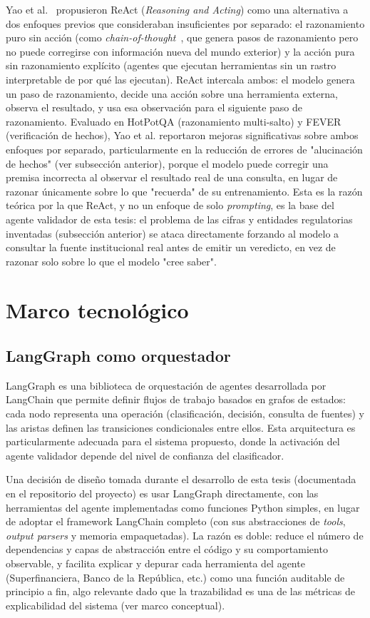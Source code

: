 Yao et al.~\cite{Yao2023} propusieron ReAct (\textit{Reasoning and Acting}) como una alternativa a dos enfoques previos que consideraban insuficientes por separado: el razonamiento puro sin acción (como \textit{chain-of-thought}~\cite{Wei2022}, que genera pasos de razonamiento pero no puede corregirse con información nueva del mundo exterior) y la acción pura sin razonamiento explícito (agentes que ejecutan herramientas sin un rastro interpretable de por qué las ejecutan). ReAct intercala ambos: el modelo genera un paso de razonamiento, decide una acción sobre una herramienta externa, observa el resultado, y usa esa observación para el siguiente paso de razonamiento. Evaluado en HotPotQA (razonamiento multi-salto) y FEVER (verificación de hechos), Yao et al. reportaron mejoras significativas sobre ambos enfoques por separado, particularmente en la reducción de errores de "alucinación de hechos" (ver subsección anterior), porque el modelo puede corregir una premisa incorrecta al observar el resultado real de una consulta, en lugar de razonar únicamente sobre lo que "recuerda" de su entrenamiento. Esta es la razón teórica por la que ReAct, y no un enfoque de solo \textit{prompting}, es la base del agente validador de esta tesis: el problema de las cifras y entidades regulatorias inventadas (subsección anterior) se ataca directamente forzando al modelo a consultar la fuente institucional real antes de emitir un veredicto, en vez de razonar solo sobre lo que el modelo "cree saber".

\section{Marco tecnológico}

\subsection{LangGraph como orquestador}

LangGraph es una biblioteca de orquestación de agentes desarrollada por LangChain que permite definir flujos de trabajo basados en grafos de estados: cada nodo representa una operación (clasificación, decisión, consulta de fuentes) y las aristas definen las transiciones condicionales entre ellos. Esta arquitectura es particularmente adecuada para el sistema propuesto, donde la activación del agente validador depende del nivel de confianza del clasificador.

Una decisión de diseño tomada durante el desarrollo de esta tesis (documentada en el repositorio del proyecto) es usar LangGraph directamente, con las herramientas del agente implementadas como funciones Python simples, en lugar de adoptar el framework LangChain completo (con sus abstracciones de \textit{tools}, \textit{output parsers} y memoria empaquetadas). La razón es doble: reduce el número de dependencias y capas de abstracción entre el código y su comportamiento observable, y facilita explicar y depurar cada herramienta del agente (Superfinanciera, Banco de la República, etc.) como una función auditable de principio a fin, algo relevante dado que la trazabilidad es una de las métricas de explicabilidad del sistema (ver marco conceptual).

